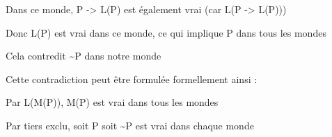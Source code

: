 \documentclass[10pt]{report}
\begin{document}
\begin{coqdoccode}
\begin{coqdoccomment}
\coqdocindent{0.50em}
Dans\coqdocindent{0.50em}
ce\coqdocindent{0.50em}
monde,\coqdocindent{0.50em}
P\coqdocindent{0.50em}
->\coqdocindent{0.50em}
L(P)\coqdocindent{0.50em}
est\coqdocindent{0.50em}
également\coqdocindent{0.50em}
vrai\coqdocindent{0.50em}
(car\coqdocindent{0.50em}
L(P\coqdocindent{0.50em}
->\coqdocindent{0.50em}
L(P)))\coqdocindent{0.50em}
\end{coqdoccomment}
\coqdoceol
\coqdocindent{2.00em}
\begin{coqdoccomment}
\coqdocindent{0.50em}
Donc\coqdocindent{0.50em}
L(P)\coqdocindent{0.50em}
est\coqdocindent{0.50em}
vrai\coqdocindent{0.50em}
dans\coqdocindent{0.50em}
ce\coqdocindent{0.50em}
monde,\coqdocindent{0.50em}
ce\coqdocindent{0.50em}
qui\coqdocindent{0.50em}
implique\coqdocindent{0.50em}
P\coqdocindent{0.50em}
dans\coqdocindent{0.50em}
tous\coqdocindent{0.50em}
les\coqdocindent{0.50em}
mondes\coqdocindent{0.50em}
\end{coqdoccomment}
\coqdoceol
\coqdocindent{2.00em}
\begin{coqdoccomment}
\coqdocindent{0.50em}
Cela\coqdocindent{0.50em}
contredit\coqdocindent{0.50em}
\~{}P\coqdocindent{0.50em}
dans\coqdocindent{0.50em}
notre\coqdocindent{0.50em}
monde\coqdocindent{0.50em}
\end{coqdoccomment}
\coqdoceol
\coqdocemptyline
\coqdocindent{2.00em}
\begin{coqdoccomment}
\coqdocindent{0.50em}
Cette\coqdocindent{0.50em}
contradiction\coqdocindent{0.50em}
peut\coqdocindent{0.50em}
être\coqdocindent{0.50em}
formulée\coqdocindent{0.50em}
formellement\coqdocindent{0.50em}
ainsi\coqdocindent{0.50em}
:\coqdocindent{0.50em}
\end{coqdoccomment}
\coqdoceol
\coqdocemptyline
\coqdocindent{2.00em}
\begin{coqdoccomment}
\coqdocindent{0.50em}
Par\coqdocindent{0.50em}
L(M(P)),\coqdocindent{0.50em}
M(P)\coqdocindent{0.50em}
est\coqdocindent{0.50em}
vrai\coqdocindent{0.50em}
dans\coqdocindent{0.50em}
tous\coqdocindent{0.50em}
les\coqdocindent{0.50em}
mondes\coqdocindent{0.50em}
\end{coqdoccomment}
\coqdoceol
\coqdocindent{2.00em}
\begin{coqdoccomment}
\coqdocindent{0.50em}
Par\coqdocindent{0.50em}
tiers\coqdocindent{0.50em}
exclu,\coqdocindent{0.50em}
soit\coqdocindent{0.50em}
P\coqdocindent{0.50em}
soit\coqdocindent{0.50em}
\~{}P\coqdocindent{0.50em}
est\coqdocindent{0.50em}
vrai\coqdocindent{0.50em}
dans\coqdocindent{0.50em}
chaque\coqdocindent{0.50em}
monde\coqdocindent{0.50em}

\end{coqdoccomment}
\end{coqdoccode}
\end{document}
